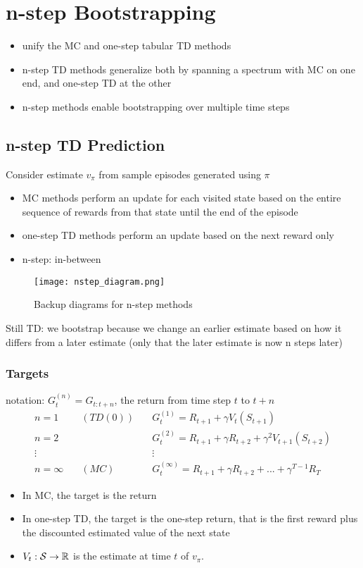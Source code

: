 \documentclass[sutton_barto_notes.tex]{subfiles}
\begin{document}
\newpage
\section{n-step Bootstrapping}

\begin{itemize}
\item unify the MC and one-step tabular TD methods
\item n-step TD methods generalize both by spanning a spectrum with MC on one end, and one-step TD at the other
\item n-step methods enable bootstrapping over multiple time steps
\end{itemize}

\subsection{n-step TD Prediction}

Consider estimate $v_\pi$ from sample episodes generated using $\pi$
\begin{itemize}
\item MC methods perform an update for each visited state based on the entire sequence of rewards from that state until the end of the episode
\item one-step TD methods perform an update based on the next reward only
\item n-step: in-between
\end{itemize}
\begin{figure}[h!]
    \centering
     \texttt{[image: nstep\_diagram.png]}
    \caption{ Backup diagrams for n-step methods }
\end{figure}
Still TD: we bootstrap because we change an earlier estimate based on how it differs from a later estimate (only that the later estimate is now n steps later)

\subsubsection{Targets}

notation: $G_t^{(n)} = G_{t:t+n}$, the return from time step $t$ to $t+n$
\begin{align}
n = 1 & \quad (TD(0)) \quad &  G_t^{(1)} = R_{t+1} + \gamma V_t(S_{t+1}) \label{eq:7.1}\tag{7.1}\\
n = 2 &  &  G_t^{(2)} = R_{t+1} + \gamma R_{t+2} + \gamma^2 V_{t+1}(S_{t+2})\tag{}\\
\vdots &  &  \vdots\tag{}\\
n = \infty & \quad (MC) \quad &  G_t^{(\infty)} = R_{t+1} + \gamma R_{t+2} + ... + \gamma^{T-1} R_T \label{eq:7.2}\tag{7.2}
\end{align}
\begin{itemize}
\item In MC, the target is the return
\item In one-step TD, the target is the one-step return, that is the first reward plus the discounted estimated value of the next state
\item $V_t: \operatorname*{\mathcal{S}} \rightarrow \operatorname*{\mathbb{R}}$ is the estimate at time $t$ of $v_\pi$.
\end{itemize}
\end{document}
